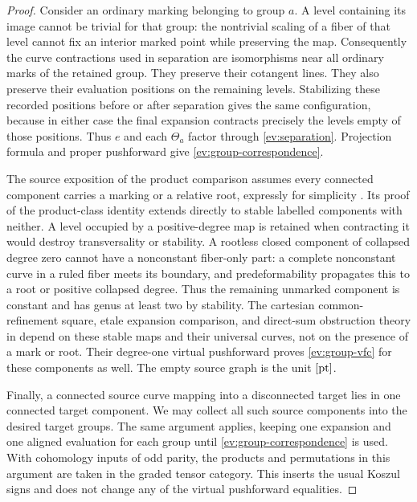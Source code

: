 \begin{proof}
Consider an ordinary marking belonging to group $a$.  A level
containing its image cannot be trivial for that group: the
nontrivial scaling of a fiber of that level cannot fix an interior
marked point while preserving the map.  Consequently the curve
contractions used in separation are isomorphisms near all ordinary
marks of the retained group.  They preserve their cotangent lines.
They also preserve their evaluation positions on the remaining
levels.  Stabilizing these recorded positions before or after
separation gives the same configuration, because in either case
the final expansion contracts precisely the levels empty of those
positions.  Thus $e$ and each $\Theta_a$ factor through
\eqref{ev:separation}.  Projection formula and proper pushforward
give \eqref{ev:group-correspondence}.

The source exposition of the product comparison assumes every
connected component carries a marking or a relative root, expressly
for simplicity \cite[Section~4.7.1]{AF2016}.  Its proof of the
product-class identity extends directly to stable labelled components
with neither.  A level occupied by a positive-degree map is retained
when contracting it would destroy transversality or stability.  A
rootless closed component of collapsed degree zero cannot have a
nonconstant fiber-only part: a
complete nonconstant curve in a ruled fiber meets its boundary, and
predeformability propagates this to a root or positive collapsed
degree.  Thus the remaining unmarked component is constant and has
genus at least two by stability.  The cartesian common-refinement
square, etale expansion comparison, and direct-sum obstruction theory
in \cite[Lemmas~4.16--4.18]{AF2016} depend on these stable maps and
their universal curves, not on the presence of a mark or root.
Their degree-one virtual pushforward proves
\eqref{ev:group-vfc} for these components as well.  The empty
source graph is the unit $[\mathrm{pt}]$.

Finally, a connected source curve mapping into a disconnected
target lies in one connected target component.  We may collect all
such source components into the desired target groups.  The same
argument applies, keeping one expansion and one aligned evaluation
for each group until \eqref{ev:group-correspondence} is used.
With cohomology inputs of odd parity, the products and permutations
in this argument are taken in the graded tensor category.  This
inserts the usual Koszul signs and does not change any of the
virtual pushforward equalities.
\end{proof}

